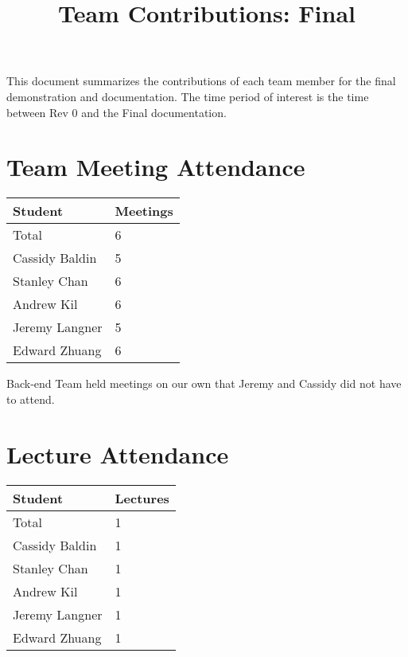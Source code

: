\documentclass{article}
\title{Team Contributions: Final\\\progname}
\author{\authname}
\date{}
\begin{document}
\maketitle

This document summarizes the contributions of each team member for the final
demonstration and documentation.  The time period of interest is the time
between Rev 0 and the Final documentation.

\section{Team Meeting Attendance}


\begin{table}[H]
\centering
\begin{tabular}{ll}
\toprule
\textbf{Student} & \textbf{Meetings}\\
\midrule
Total & 6\\
Cassidy Baldin & 5\\
Stanley Chan & 6\\
Andrew Kil & 6\\
Jeremy Langner & 5\\
Edward Zhuang & 6\\
\bottomrule
\end{tabular}
\end{table}

\noindent Back-end Team held meetings on our own that Jeremy and Cassidy did not have to attend. 

\section{Lecture Attendance}


\begin{table}[H]
\centering
\begin{tabular}{ll}
\toprule
\textbf{Student} & \textbf{Lectures}\\
\midrule
Total & 1\\
Cassidy Baldin & 1\\
Stanley Chan & 1\\
Andrew Kil & 1\\
Jeremy Langner & 1\\
Edward Zhuang & 1\\
\bottomrule
\end{tabular}
\end{table}
\end{document}
